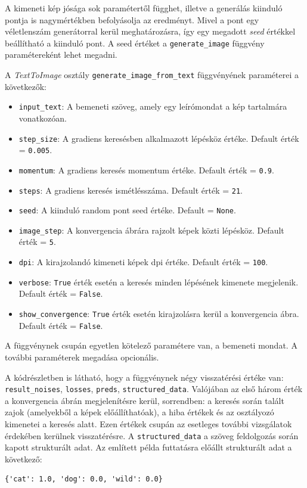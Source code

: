 A kimeneti kép jósága sok paramétertől függhet, illetve a generálás kiinduló pontja is nagymértékben befolyásolja az eredményt. Mivel a pont egy véletlenszám generátorral kerül meghatározásra, így egy megadott \textit{seed} értékkel beállítható a kiinduló pont. A seed értéket a \texttt{generate\_image} függvény paramétereként lehet megadni.

\newpage

A \textit{TextToImage} osztály \texttt{generate\_image\_from\_text} függvényének paraméterei a következők:

\begin{itemize}
	\item \texttt{input\_text}: A bemeneti szöveg, amely egy leírómondat a kép tartalmára vonatkozóan.
	\item \texttt{step\_size}: A gradiens keresésben alkalmazott lépésköz értéke. Default érték = \texttt{0.005}.
	\item \texttt{momentum}: A gradiens keresés momentum értéke. Default érték = \texttt{0.9}.
	\item \texttt{steps}: A gradiens keresés ismétlésszáma. Default érték = \texttt{21}.
	\item \texttt{seed}: A kiinduló random pont seed értéke. Default = \texttt{None}.
	\item \texttt{image\_step}: A konvergencia ábrára rajzolt képek közti lépésköz. Default érték = \texttt{5}.
	\item \texttt{dpi}: A kirajzolandó kimeneti képek dpi értéke. Default érték = \texttt{100}.
	\item \texttt{verbose}: \texttt{True} érték esetén a keresés minden lépésének kimenete megjelenik. Default érték = \texttt{False}.
	\item \texttt{show\_convergence}: \texttt{True} érték esetén kirajzolásra kerül a konvergencia ábra. Default érték = \texttt{False}.
\end{itemize}

A függvénynek csupán egyetlen kötelező paramétere van, a bemeneti mondat. A további paraméterek megadása opcionális.

A kódrészletben is látható, hogy a függvénynek négy visszatérési értéke van: \\ \texttt{result\_noises}, \texttt{losses}, \texttt{preds}, \texttt{structured\_data}. Valójában az első három érték a konvergencia ábrán megjelenítésre kerül, sorrendben: a keresés során talált zajok (amelyekből a képek előállíthatóak), a hiba értékek és az osztályozó kimenetei a keresés alatt. Ezen értékek csupán az esetleges további vizsgálatok érdekében kerülnek visszatérésre. A \texttt{structured\_data} a szöveg feldolgozás során kapott strukturált adat.
Az említett példa futtatásra előállt strukturált adat a következő:
\begin{verbatim}
{'cat': 1.0, 'dog': 0.0, 'wild': 0.0}
\end{verbatim}

